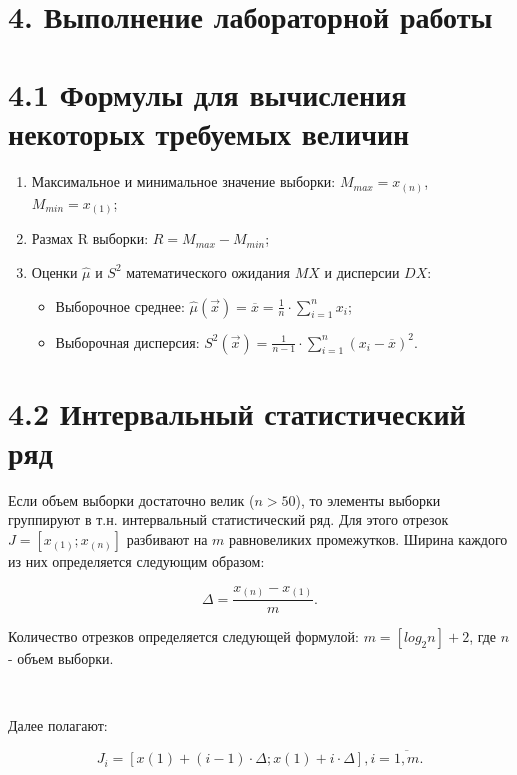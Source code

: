 \documentclass[12pt]{report}
\begin{document}
~\

\clearpage
\section*{4. Выполнение лабораторной работы}

\section*{4.1 Формулы для вычисления некоторых требуемых величин}

\begin{enumerate}
	\item Максимальное и минимальное значение выборки: $M_{max} = x_{(n)}$, $M_{min} = x_{(1)}$;
	\item Размах R выборки: $R = M_{max} - M_{min}$;
	\item Оценки $\hat\mu$ и $S^2$ математического ожидания $MX$ и дисперсии $DX$:
		\begin{itemize}
			\item Выборочное среднее: $\hat\mu(\vec{x}) = \overline x = \frac{1}{n} \cdot \sum\limits_{i=1}^{n} x_i$;
			\item Выборочная дисперсия: $S^2(\vec{x}) = \frac{1}{n-1} \cdot \sum\limits_{i=1}^{n} (x_i - \overline x)^2$.
		\end{itemize}
\end{enumerate}

\section*{4.2 Интервальный статистический ряд}

Если объем выборки достаточно велик ($n > 50$), то элементы выборки группируют в т.н. интервальный статистический ряд. Для этого отрезок $J = [x_{(1)}; x_{(n)}]$ разбивают на $m$ равновеликих промежутков. Ширина каждого из них определяется следующим образом:

\begin{equation*}
	\Delta = \frac{x_{(n)} - x_{(1)}}{m}.
\end{equation*}

Количество отрезков определяется следующей формулой: $m = [log_2 n] + 2$, где $n$ - объем выборки.

~\

Далее полагают:

\begin{equation*}
	J_i = [x(1) + (i - 1) \cdot \Delta; x(1) + i \cdot \Delta], i = \overline{1, m}.
\end{equation*}
\end{document}
